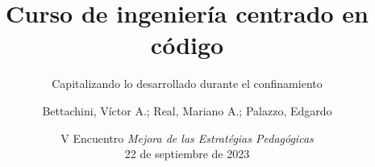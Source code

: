 \documentclass[aspectratio=43]{beamer}
\begin{document}
\title{Curso de ingeniería centrado en código}
\subtitle{Capitalizando lo desarrollado durante el confinamiento}
\author[vbettachini@unlam.edu.ar]{Bettachini, Víctor A.; Real, Mariano A.; Palazzo, Edgardo}
\date[2023-09-22]{
	V Encuentro \emph{Mejora de las Estratégias Pedagógicas}\\22 de septiembre de 2023
}


\begin{frame} 
  \titlepage
\end{frame}

\end{document}
